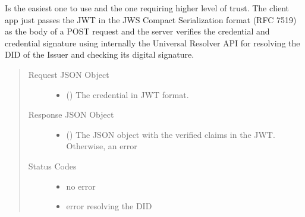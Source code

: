 \documentclass[a4paper,12pt,english]{sphinxhowto}
\begin{document}
\begin{fulllineitems}
\sphinxAtStartPar
Is the easiest one to use and the one requiring higher level of trust. The client app just passes the JWT in the JWS Compact Serialization format (RFC 7519) as the body of a POST request and the server verifies the credential and credential signature using internally the Universal Resolver API for resolving the DID of the Issuer and checking its digital signature.
\begin{quote}\begin{description}
\item[{Request JSON Object}] \leavevmode\begin{itemize}
\item {} 
\sphinxAtStartPar
{} () \textendash{} The credential in JWT format.

\end{itemize}

\item[{Response JSON Object}] \leavevmode\begin{itemize}
\item {} 
\sphinxAtStartPar
{} () \textendash{} The JSON object with the verified claims in the JWT. Otherwise, an error

\end{itemize}

\item[{Status Codes}] \leavevmode\begin{itemize}
\item {} 
\sphinxAtStartPar
{} \textendash{} no error

\item {} 
\sphinxAtStartPar
{} \textendash{} error resolving the DID

\end{itemize}

\end{description}\end{quote}

\end{fulllineitems}
\end{document}
